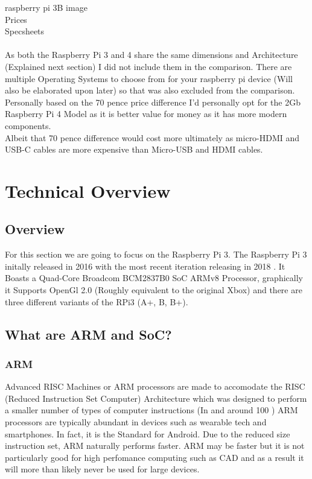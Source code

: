 \documentclass{article}
\begin{document}
	raspberry pi 3B image \citep{bestbuy}\\
	Prices \citep{okdo}\\
	Specsheets \citep{raspberrypifourspecs} \citep{raspberrypithree}\\\\
	As both the Raspberry Pi 3 and 4 share the same dimensions and Architecture (Explained next section) I did not include them in the comparison. There are multiple Operating Systems to choose from for your raspberry pi device (Will also be elaborated upon later) so that was also excluded from the comparison.\\ Personally based on the 70 pence price difference I'd personally opt for the 2Gb Raspberry Pi 4 Model as it is better value for money as it has more modern components.\\Albeit that 70 pence difference would cost more ultimately as micro-HDMI and USB-C cables are more expensive than Micro-USB and HDMI cables. 
	\newpage
	\section{Technical Overview}
	\subsection{Overview}
	For this section we are going to focus on the Raspberry Pi 3. The Raspberry Pi 3 initally released in 2016 with the most recent iteration releasing in 2018 \citep{raspberrypithree}. It Boasts a Quad-Core Broadcom BCM2837B0 SoC ARMv8 Processor, graphically it Supports OpenGl 2.0 (Roughly equivalent to the original Xbox) and there are three different variants of the RPi3 (A+, B, B+). 
	\subsection{What are ARM and SoC?}
	\subsubsection{ARM}
	Advanced RISC Machines or ARM processors are made to accomodate the RISC (Reduced Instruction Set Computer) Architecture which was designed to perform a smaller number of types of computer instructions (In and around 100 \citep{burch}) ARM processors are typically abundant in devices such as wearable tech and smartphones. In fact, it is the Standard for Android. Due to the reduced size instruction set, ARM naturally performs faster. ARM may be faster but it is not particularly good for high perfomance computing such as CAD and as a result it will more than likely never be used for large devices.
\end{document}
